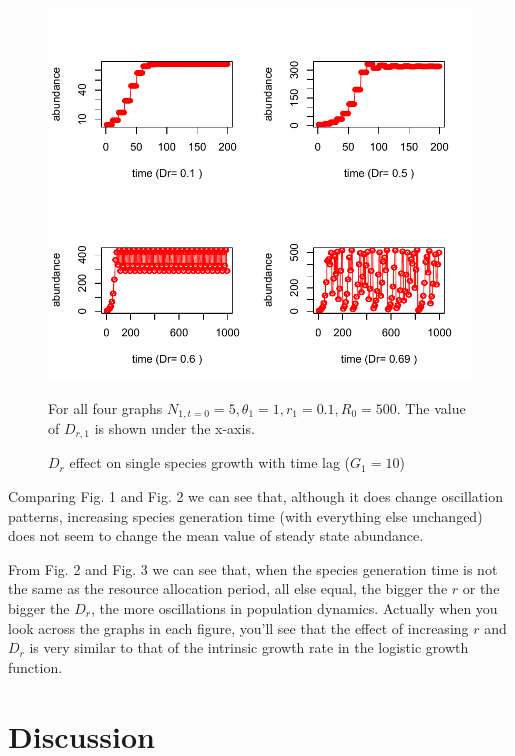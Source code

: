 \documentclass[12pt]{article}
\begin{document}
\begin{figure}
 \includegraphics[width=\textwidth]{1sp_sojourn_Dreffect.pdf}
 \caption{$D_r$ effect on single species growth with time lag ($G_1=10$)}
For all four graphs $ N_{1,t=0}=5, \theta_1=1, r_1= 0.1, R_0=500$. The value of $D_{r,1}$ is shown under the x-axis.
\end{figure}

Comparing Fig. 1 and Fig. 2 we can see that, although it does change oscillation patterns, increasing species generation time (with everything else unchanged) does not seem to change the mean value of steady state abundance. 

From Fig. 2 and Fig. 3 we can see that, when the species generation time is not the same as the resource allocation period, all else equal, the bigger the $r$ or the bigger the $D_r$, the more oscillations in population dynamics. Actually when you look across the graphs in each figure, you'll see that the effect of increasing $r$ and $D_r$ is very similar to that of the intrinsic growth rate in the logistic growth function. 


\section{Discussion}
\end{document}
